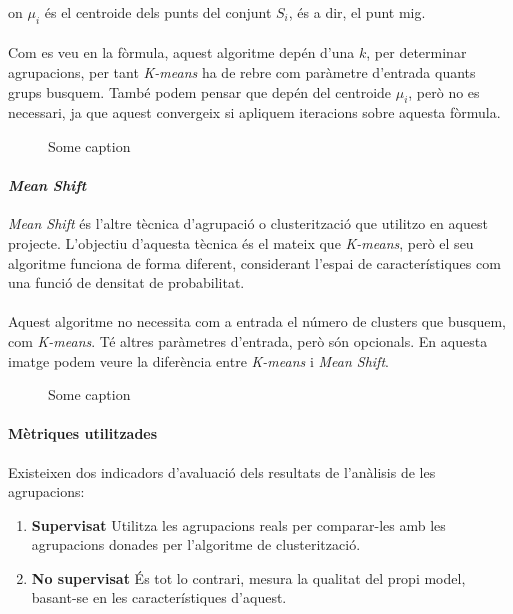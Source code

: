 \documentclass[12pt,a4paper,catalan]{article}
\begin{document}
on $\mu_i$ és el centroide dels punts del conjunt $S_i$, és a dir, el punt mig.
\\
\\
Com es veu en la fòrmula, aquest algoritme depén d'una $k$, per determinar agrupacions, per tant \textit{K-means} ha de rebre com paràmetre d'entrada quants grups busquem. També podem pensar que depén del centroide $\mu_i$, però no es necessari, ja que aquest convergeix si apliquem iteracions sobre aquesta fòrmula.

\begin{figure}[h]
\centering
{}
\caption{Some caption}
\end{figure}

\newpage

\paragraph{\textit{Mean Shift}}
\textit{Mean Shift} és l'altre tècnica d'agrupació o clusterització que utilitzo en aquest projecte. L'objectiu d'aquesta tècnica és el mateix que \textit{K-means}, però el seu algoritme funciona de forma diferent, considerant l'espai de característiques com una funció de densitat de probabilitat.
\\
\\
Aquest algoritme no necessita com a entrada el número de clusters que busquem, com \textit{K-means}. Té altres paràmetres d'entrada, però són opcionals. En aquesta imatge podem veure la diferència entre \textit{K-means} i \textit{Mean Shift}.

\begin{figure}[h]
\centering
{}
\caption{Some caption}
\end{figure}

\newpage

\paragraph{Mètriques utilitzades}
Existeixen dos indicadors d'avaluació dels resultats de l'anàlisis de les agrupacions:
\begin{enumerate}
	\item \textbf{Supervisat} Utilitza les agrupacions reals per comparar-les amb les agrupacions donades per l'algoritme de clusterització.
	\item \textbf{No supervisat} És tot lo contrari, mesura la qualitat del propi model, basant-se en les característiques d'aquest.
\end{enumerate}
\end{document}
